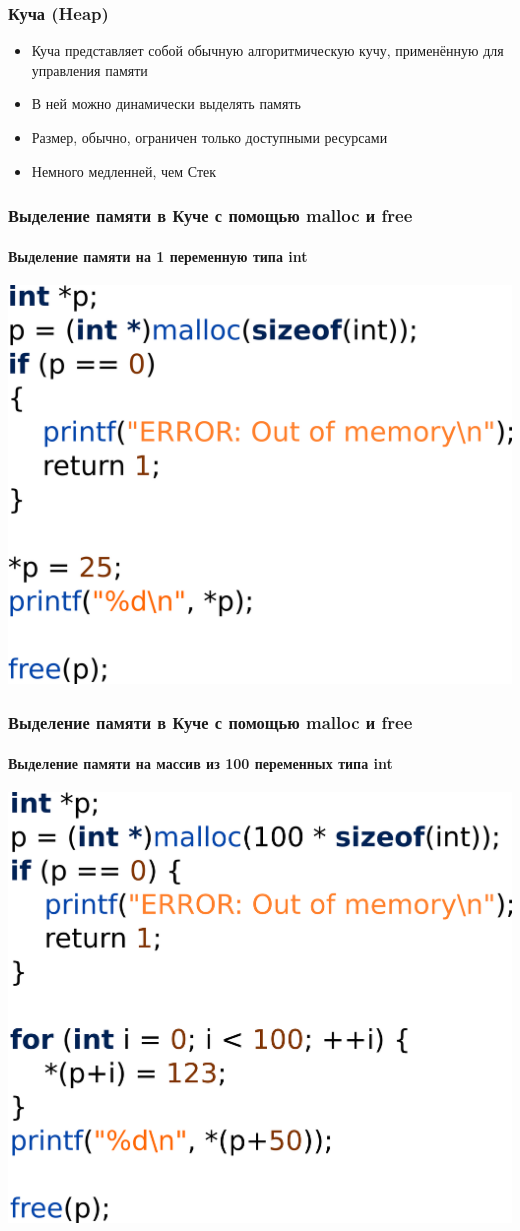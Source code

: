 \documentclass[12pt,pdf,hyperref={unicode}]{beamer}
\begin{document}
\begin{frame}[fragile]
\frametitle{Куча (Heap)} 
\begin{itemize}
\item Куча представляет собой обычную алгоритмическую кучу, применённую для управления памяти
\item В ней можно динамически выделять память
\item Размер, обычно, ограничен только доступными ресурсами
\item Немного медленней, чем Стек
\end{itemize}
\end{frame}


\begin{frame}[fragile]
\frametitle{Выделение памяти в Куче с помощью malloc и free} 
\framesubtitle{Выделение памяти на 1 переменную типа int} 
\begin{center}
\includegraphics[width=0.55\linewidth]{images/malloc_free_1.png}
\end{center}
\end{frame}

\begin{frame}[fragile]
\frametitle{Выделение памяти в Куче с помощью malloc и free} 
\framesubtitle{Выделение памяти на массив из 100 переменных типа int} 
\begin{center}
\includegraphics[width=0.55\linewidth]{images/malloc_free_2.png}
\end{center}
\end{frame}
\end{document}
